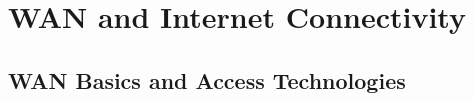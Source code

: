 \documentclass[aspectratio=169]{beamer}  %
\begin{document}
\section{WAN and Internet Connectivity}
\subsection{WAN Basics and Access Technologies}


\end{document}

